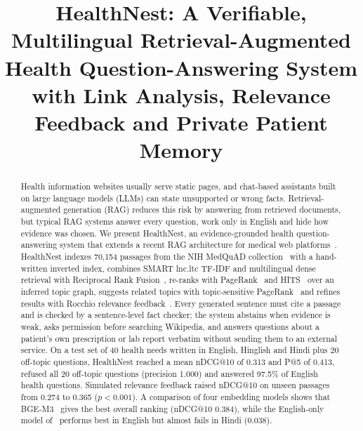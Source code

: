 \documentclass[conference]{IEEEtran}
\begin{document}
\title{HealthNest: A Verifiable, Multilingual Retrieval-Augmented Health Question-Answering System with Link Analysis, Relevance Feedback and Private Patient Memory}

\author{
}

\maketitle

\begin{abstract}
Health information websites usually serve static pages, and chat-based assistants built on large language models (LLMs) can state unsupported or wrong facts. Retrieval-augmented generation (RAG) reduces this risk by answering from retrieved documents, but typical RAG systems answer every question, work only in English and hide how evidence was chosen. We present HealthNest, an evidence-grounded health question-answering system that extends a recent RAG architecture for medical web platforms~\cite{fedallah2026}. HealthNest indexes 70,154 passages from the NIH MedQuAD collection~\cite{abacha2019} with a hand-written inverted index, combines SMART lnc.ltc TF-IDF and multilingual dense retrieval with Reciprocal Rank Fusion~\cite{cormack2009}, re-ranks with PageRank~\cite{page1999} and HITS~\cite{kleinberg1999} over an inferred topic graph, suggests related topics with topic-sensitive PageRank~\cite{haveliwala2002} and refines results with Rocchio relevance feedback~\cite{rocchio1971}. Every generated sentence must cite a passage and is checked by a sentence-level fact checker; the system abstains when evidence is weak, asks permission before searching Wikipedia, and answers questions about a patient's own prescription or lab report verbatim without sending them to an external service. On a test set of 40 health needs written in English, Hinglish and Hindi plus 20 off-topic questions, HealthNest reached a mean nDCG@10 of 0.313 and P@5 of 0.413, refused all 20 off-topic questions (precision 1.000) and answered 97.5\% of English health questions. Simulated relevance feedback raised nDCG@10 on unseen passages from 0.274 to 0.365 ($p<0.001$). A comparison of four embedding models shows that BGE-M3~\cite{chen2024} gives the best overall ranking (nDCG@10 0.384), while the English-only model of~\cite{fedallah2026} performs best in English but almost fails in Hindi (0.038).
\end{abstract}
\end{document}
